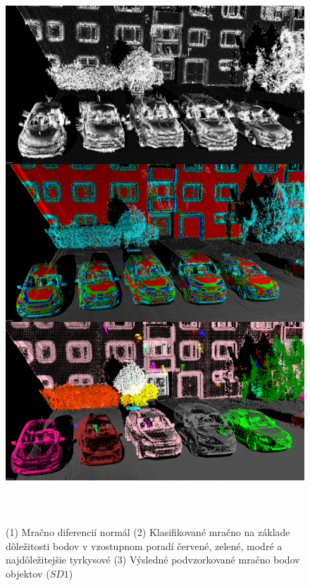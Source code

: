 \newpage\vfill
\begin{figure}[ht]
  \centering
  \includegraphics[width=15cm, height=21cm]{img/downsample_objects.png}
  \caption{(1) Mračno diferencií normál (2) Klasifikované mračno na základe dôležitosti bodov v vzostupnom poradí červené, zelené, modré a najdôležitejšie tyrkysové (3) Výsledné podvzorkované mračno bodov objektov ($SD1$)} 
  \label{fig:downsampling_objects}
\end{figure} 
\vfill\clearpage

